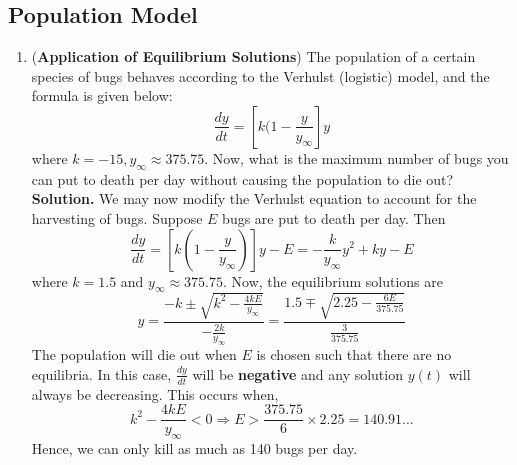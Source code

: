 \documentclass{article}
\begin{document}
\subsection{Population Model}
\begin{enumerate}
    \item (\textbf{Application of Equilibrium Solutions}) The population of a certain species of bugs behaves according to the Verhulst (logistic) model, and the formula is given below:
    \begin{equation}
        \frac{dy}{dt}=[k(1-\frac{y}{y_\infty}]y
    \end{equation}
    where $k=-15, y_{\infty}\approx375.75$. Now, what is the maximum number of bugs you can put to death per day without causing the population to die out? \newline
    \textbf{Solution.} We may now modify the Verhulst equation to account for the harvesting of bugs. Suppose $E$ bugs are put to death per day. Then
    \begin{equation*}
        \frac{dy}{dt}=[k(1-\frac{y}{y_{\infty}})]y-E=-\frac{k}{y_\infty}y^2+ky-E
    \end{equation*}
    where $k=1.5$ and $y_\infty\approx375.75$. Now, the equilibrium solutions are
    \begin{equation*}
        y=\frac{-k\pm\sqrt{k^2-\frac{4kE}{y_\infty}}}{-\frac{2k}{y_\infty}}=\frac{1.5\mp\sqrt{2.25-\frac{6E}{375.75}}}{\frac{3}{375.75}}
    \end{equation*}
    The population will die out when $E$ is chosen such that there are no equilibria. In this case, $\frac{dy}{dt}$ will be \textbf{negative} and any solution $y(t)$ will always be decreasing. This occurs when,
    \begin{equation*}
        k^2-\frac{4kE}{y_\infty}<0\Rightarrow E>\frac{375.75}{6}\times2.25=140.91\dots
    \end{equation*}
    Hence, we can only kill as much as 140 bugs per day.
\end{enumerate}
\end{document}
